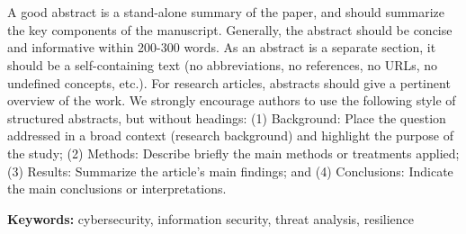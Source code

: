 %
\chapter*{}

A good abstract is a stand-alone summary of the paper, and should summarize the key components of the manuscript. Generally, the abstract should be concise and informative within 200-300 words. As an abstract is a separate section, it should be a self-containing text (no abbreviations, no references, no URLs, no undefined concepts, etc.). For research articles, abstracts should give a pertinent overview of the work. We strongly encourage authors to use the following style of structured abstracts, but without headings: (1) Background: Place the question addressed in a broad context (research background) and highlight the purpose of the study; (2) Methods: Describe briefly the main methods or treatments applied; (3) Results: Summarize the article's main findings; and (4) Conclusions: Indicate the main conclusions or interpretations.

\textbf{Keywords:} cybersecurity, information security, threat analysis, resilience
